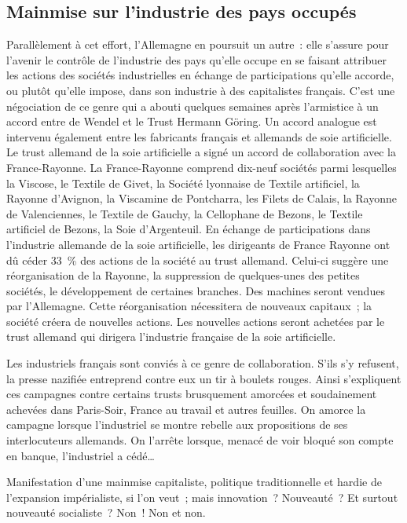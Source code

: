 \documentclass[french,twoside]{book} %
\begin{document}
\subsection[Mainmise sur l’industrie des pays occupés]{Mainmise sur l’industrie des pays occupés}
\noindent Parallèlement à cet effort, l’Allemagne en poursuit un autre : elle s’assure pour l’avenir le contrôle de l’industrie des pays qu’elle occupe en se faisant attribuer les actions des sociétés industrielles en échange de participations qu’elle accorde, ou plutôt qu’elle impose, dans son industrie à des capitalistes français. C’est une négociation de ce genre qui a abouti quelques semaines après l’armistice à un accord entre de Wendel et le Trust Hermann Göring. Un accord analogue est intervenu également entre les fabricants français et allemands de soie artificielle. Le trust allemand de la soie artificielle a signé un accord de collaboration avec la France-Rayonne. La France-Rayonne comprend dix-neuf sociétés parmi lesquelles la Viscose, le Textile de Givet, la Société lyonnaise de Textile artificiel, la Rayonne d’Avignon, la Viscamine de Pontcharra, les Filets de Calais, la Rayonne de Valenciennes, le Textile de Gauchy, la Cellophane de Bezons, le Textile artificiel de Bezons, la Soie d’Argenteuil. En échange de participations dans l’industrie allemande de la soie artificielle, les dirigeants de France Rayonne ont dû céder 33 \% des actions de la société au trust allemand. Celui-ci suggère une réorganisation de la Rayonne, la suppression de quelques-unes des petites sociétés, le développement de certaines branches. Des machines seront vendues par l’Allemagne. Cette réorganisation nécessitera de nouveaux capitaux ; la société créera de nouvelles actions. Les nouvelles actions seront achetées par le trust allemand qui dirigera l’industrie française de la soie artificielle.\par
Les industriels français sont conviés à ce genre de collaboration. S’ils s’y refusent, la presse nazifiée entreprend contre eux un tir à boulets rouges. Ainsi s’expliquent ces campagnes contre certains trusts brusquement amorcées et soudainement achevées dans Paris-Soir, France au travail et autres feuilles. On amorce la campagne lorsque l’industriel se montre rebelle aux propositions de ses interlocuteurs allemands. On l’arrête lorsque, menacé de voir bloqué son compte en banque, l’industriel a cédé…\par
Manifestation d’une mainmise capitaliste, politique traditionnelle et hardie de l’expansion impérialiste, si l’on veut ; mais innovation ? Nouveauté ? Et surtout nouveauté socialiste ? Non ! Non et non.
\end{document}
